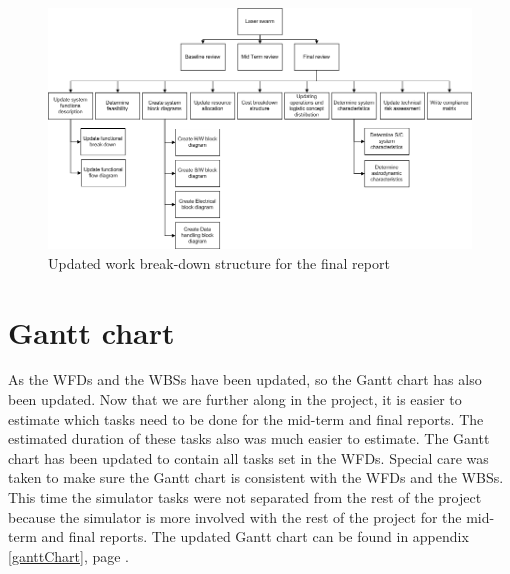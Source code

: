 \begin{figure}
\centering
\includegraphics[width=\textheight, angle=90]{chapters/img/Workbreakdown_structure_FR_v2.png}
\caption{Updated work break-down structure for the final report}
\label{fig:WFfinal2}
\end{figure}

\section{Gantt chart}
\label{Gantt}
As the \acp{WFD} and the \acp{WBS} have been updated, so the Gantt chart has also been updated. 
Now that we are further along in the project, it is easier to estimate which tasks need to be done for the mid-term and final reports. The estimated duration of these tasks also was much easier to estimate. The Gantt chart has been updated to contain all tasks set in the \ac{WFD}s. Special care was taken to make sure the Gantt chart is consistent with the \acp{WFD} and the \acp{WBS}.
This time the simulator tasks were not separated from the rest of the project because the simulator is more involved with the 
rest of the project for the mid-term and final reports.
The updated Gantt chart can be found in appendix \ref{ganttChart}, page \pageref{ganttChart}.